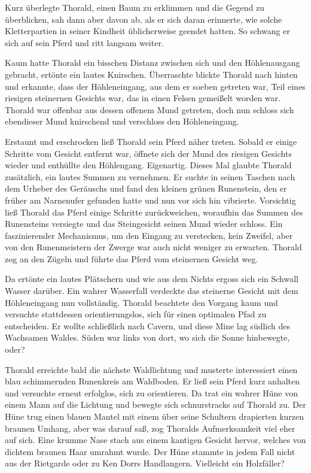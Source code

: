 \documentclass[10pt, a4paper, oneside]{book}
\begin{document}
Kurz überlegte Thorald, einen Baum zu erklimmen und die Gegend zu überblicken, sah dann aber davon ab, als er sich daran erinnerte, wie solche Kletterpartien in seiner Kindheit üblicherweise geendet hatten. So schwang er sich auf sein Pferd und ritt langsam weiter.

Kaum hatte Thorald ein bisschen Distanz zwischen sich und den Höhlenausgang gebracht, ertönte ein lautes Knirschen. Überraschte blickte Thorald nach hinten und erkannte, dass der Höhleneingang, aus dem er soeben getreten war, Teil eines riesigen steinernen Gesichts war, das in einen Felsen gemeißelt worden war. Thorald war offenbar aus dessen offenem Mund getreten, doch nun schloss sich ebendieser Mund knirschend und verschloss den Höhleneingang.

Erstaunt und erschrocken ließ Thorald sein Pferd näher treten. Sobald er einige Schritte vom Gesicht entfernt war, öffnete sich der Mund des riesigen Gesichts wieder und enthüllte den Höhlengang. Eigenartig. Dieses Mal glaubte Thorald zusätzlich, ein lautes Summen zu vernehmen. Er suchte in seinen Taschen nach dem Urheber des Geräuschs und fand den kleinen grünen Runenstein, den er früher am Narnenufer gefunden hatte und nun vor sich hin vibrierte. Vorsichtig ließ Thorald das Pferd einige Schritte zurückweichen, woraufhin das Summen des Runensteins versiegte und das Steingesicht seinen Mund wieder schloss. Ein faszinierender Mechanismus, um den Eingang zu verstecken, kein Zweifel, aber von den Runenmeistern der Zwerge war auch nicht weniger zu erwarten. Thorald zog an den Zügeln und führte das Pferd vom steinernen Gesicht weg.

Da ertönte ein lautes Plätschern und wie aus dem Nichts ergoss sich ein Schwall Wasser darüber. Ein wahrer Wasserfall verdeckte das steinerne Gesicht mit dem Höhleneingang nun vollständig. Thorald beachtete den Vorgang kaum und versuchte stattdessen orientierungslos, sich für einen optimalen Pfad zu entscheiden. Er wollte schließlich nach Cavern, und diese Mine lag südlich des Wachsamen Waldes. Süden war links von dort, wo sich die Sonne hinbewegte, oder?\bigskip







Thorald erreichte bald die nächste Waldlichtung und musterte interessiert einen blau schimmernden Runenkreis am Waldboden. Er ließ sein Pferd kurz anhalten und versuchte erneut erfolglos, sich zu orientieren. Da trat ein wahrer Hüne von einem Mann auf die Lichtung und bewegte sich schnurstracks auf Thorald zu. Der Hüne trug einen blauen Mantel mit einem über seine Schultern drapierten kurzen braunen Umhang, aber was darauf saß, zog Thoralds Aufmerksamkeit viel eher auf sich. Eine krumme Nase stach aus einem kantigen Gesicht hervor, welches von dichtem braunen Haar umrahmt wurde. Der Hüne stammte in jedem Fall nicht aus der Rietgarde oder zu Ken Dorrs Handlangern. Vielleicht ein Holzfäller?
\end{document}
